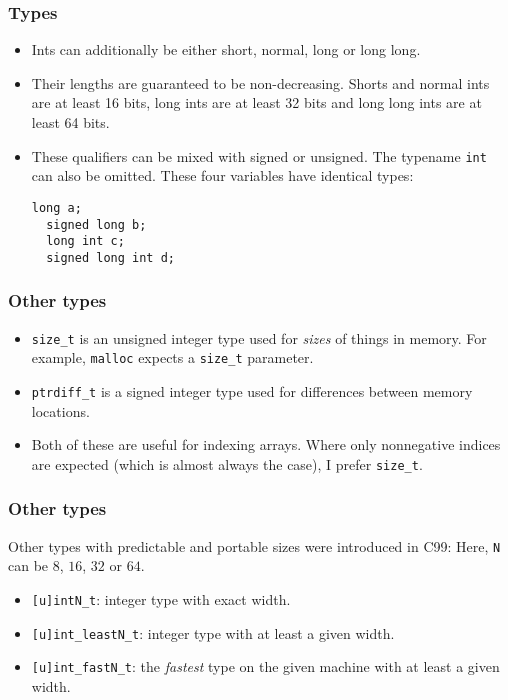 \begin{frame}[fragile]
  \frametitle{Types}
  \begin{itemize}
  \item Ints can additionally be either short, normal, long or long long.
  \item Their lengths are guaranteed to be non-decreasing. Shorts and normal
    ints are at least 16 bits, long ints are at least 32 bits and long long ints
    are at least 64 bits.
  \item These qualifiers can be mixed with signed or unsigned. The typename
    \texttt{int} can also be omitted. These four variables have identical types:
\begin{lstlisting}[style=c]
  long a;
  signed long b;
  long int c;
  signed long int d;
\end{lstlisting}
  \end{itemize}
\end{frame}

\begin{frame}
  \frametitle{Other types}
  \begin{itemize}
  \item \texttt{size\_t} is an unsigned integer type used for \emph{sizes} of
    things in memory. For example, \texttt{malloc} expects a \texttt{size\_t}
    parameter.
  \item \texttt{ptrdiff\_t} is a signed integer type used for differences
    between memory locations.
  \item Both of these are useful for indexing arrays. Where only nonnegative
    indices are expected (which is almost always the case), I prefer
    \texttt{size\_t}.
  \end{itemize}
\end{frame}

\begin{frame}
  \frametitle{Other types}
  Other types with predictable and portable sizes were introduced in C99: Here,
  \texttt{N} can be $8$, $16$, $32$ or $64$.
  \begin{itemize}
  \item \texttt{[u]intN\_t}: integer type with exact width.
  \item \texttt{[u]int\_leastN\_t}: integer type with at least a given width.
  \item \texttt{[u]int\_fastN\_t}: the \emph{fastest} type on the given machine
    with at least a given width.
  \end{itemize}
\end{frame}

